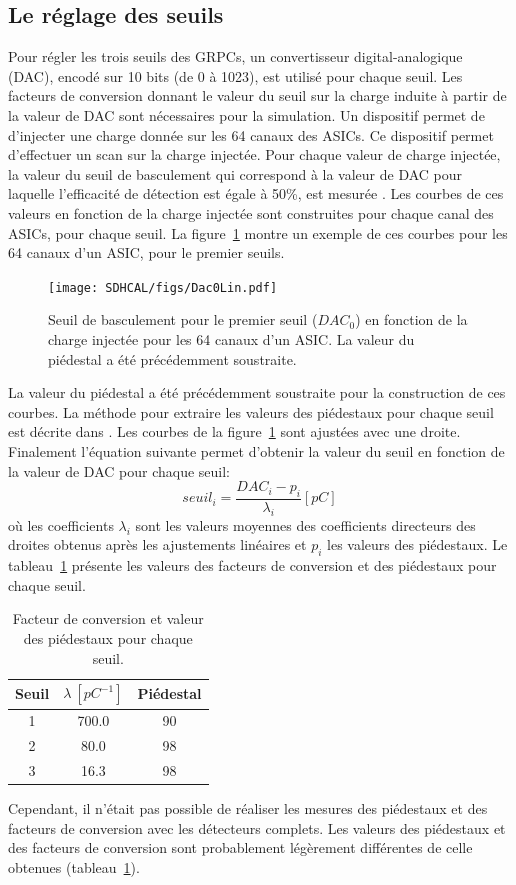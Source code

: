 \subsection{Le réglage des seuils}
\label{sec.sdhcal_thr}
Pour régler les trois seuils des GRPCs, un convertisseur digital-analogique (DAC), encodé sur 10 bits (de 0 à 1023), est utilisé pour chaque seuil. Les facteurs de conversion donnant le valeur du seuil sur la charge induite à partir de la valeur de DAC sont nécessaires pour la simulation. Un dispositif permet de d'injecter une charge donnée sur les 64 canaux des ASICs. Ce dispositif permet d'effectuer un scan sur la charge injectée. Pour chaque valeur de charge injectée, la valeur du seuil de basculement qui correspond à la valeur de DAC pour laquelle l'efficacité de détection est égale à 50\%, est mesurée \cite{kieffer}. Les courbes de ces valeurs en fonction de la charge injectée sont construites pour chaque canal des ASICs, pour chaque seuil. La figure~\ref{dac-vs-inj} montre un exemple de ces courbes pour les 64 canaux d'un ASIC, pour le premier seuils. 
\begin{figure}[!ht]
  \centering
  \texttt{[image: SDHCAL/figs/Dac0Lin.pdf]}
  \caption{Seuil de basculement pour le premier seuil ($DAC_0$) en fonction de la charge injectée pour les 64 canaux d'un ASIC. La valeur du piédestal a été précédemment soustraite.}
  \label{dac-vs-inj}
\end{figure}
La valeur du piédestal a été précédemment soustraite pour la construction de ces courbes. La méthode pour extraire les valeurs des piédestaux pour chaque seuil est décrite dans \cite{kieffer}. Les courbes de la figure~\ref{dac-vs-inj} sont ajustées avec une droite. Finalement l'équation suivante permet d'obtenir la valeur du seuil en fonction de la valeur de DAC pour chaque seuil:
\begin{equation}
  seuil_i = \frac{DAC_i-p_i}{\lambda_i} [pC]
  \label{eq.dacConversion}
\end{equation}
où les coefficients $\lambda_i$ sont les valeurs moyennes des coefficients directeurs des droites obtenus après les ajustements linéaires et $p_i$ les valeurs des piédestaux.
Le tableau~\ref{tab.lambdas} présente les valeurs des facteurs de conversion et des piédestaux pour chaque seuil.
\begin{table}[!ht]
  \begin{center}
    \begin{tabular}{c|c|c}
      Seuil & $\lambda~[pC^{-1}]$ & Piédestal\\
      \hline
      1 & 700.0 & 90\\
      2 & 80.0 & 98\\
      3 & 16.3 & 98
    \end{tabular}
  \end{center}  
  \caption{Facteur de conversion et valeur des piédestaux pour chaque seuil.}
  \label{tab.lambdas}
\end{table}
Cependant, il n'était pas possible de réaliser les mesures des piédestaux et des facteurs de conversion avec les détecteurs complets. Les valeurs des piédestaux et des facteurs de conversion sont probablement légèrement différentes de celle obtenues (tableau~\ref{tab.lambdas}).

